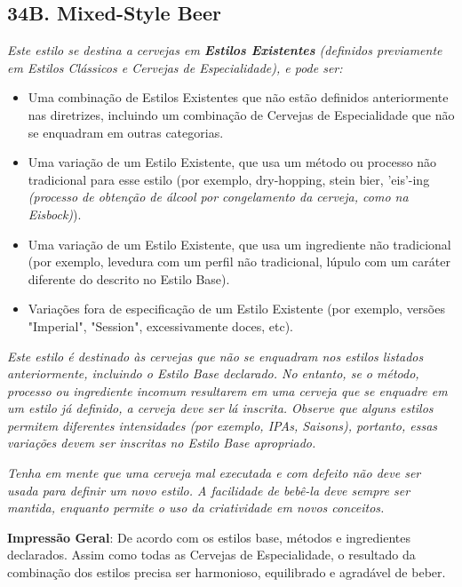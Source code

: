 \subsection*{34B. Mixed-Style Beer}

\textit{Este estilo se destina a cervejas em \textbf{Estilos Existentes} (definidos previamente em Estilos Clássicos e Cervejas de Especialidade), e pode ser:}

\begin{itemize}
  \item Uma combinação de Estilos Existentes que não estão definidos anteriormente nas diretrizes, incluindo um combinação de Cervejas de Especialidade que não se enquadram em outras categorias.
  \item Uma variação de um Estilo Existente, que usa um método ou processo não tradicional para esse estilo (por exemplo, dry-hopping, stein bier, 'eis'-ing \textit{(processo de obtenção de álcool por congelamento da cerveja, como na Eisbock)}).
  \item Uma variação de um Estilo Existente, que usa um ingrediente não tradicional (por exemplo, levedura com um perfil não tradicional, lúpulo com um caráter diferente do descrito no Estilo Base).
  \item Variações fora de especificação de um Estilo Existente (por exemplo, versões "Imperial", "Session", excessivamente doces, etc).
\end{itemize}

\textit{Este estilo é destinado às cervejas que não se enquadram nos estilos listados anteriormente, incluindo o Estilo Base declarado. No entanto, se o método, processo ou ingrediente incomum resultarem em uma cerveja que se enquadre em um estilo já definido, a cerveja deve ser lá inscrita. Observe que alguns estilos permitem diferentes intensidades (por exemplo, IPAs, Saisons), portanto, essas variações devem ser inscritas no Estilo Base apropriado.}

\textit{Tenha em mente que uma cerveja mal executada e com defeito não deve ser usada para definir um novo estilo. A facilidade de bebê-la deve sempre ser mantida, enquanto permite o uso da criatividade em novos conceitos.}

\textbf{Impressão Geral}: De acordo com os estilos base, métodos e ingredientes declarados. Assim como todas as Cervejas de Especialidade, o resultado da combinação dos estilos precisa ser harmonioso, equilibrado e agradável de beber.

